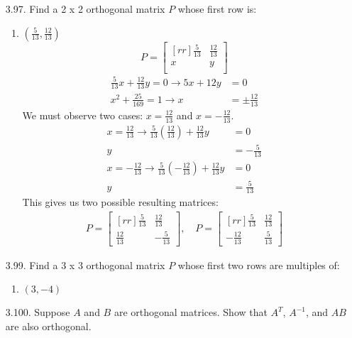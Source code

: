 \documentclass[12pt]{article}
\begin{document}
\begin{enumerate}
\begin{enumerate}
	
	\item $A^2$
	\begin{proof}
	Assume that $A$ is symmetric, then $A=A^T$. We show that $A^2=(A^2)^T$.\\
	Note that $A^2 = A*A$. Since $A$ is symmetric, then $A*A=A^T*A^T$ and by the distributive law,$A^T*A^T=(A*A)^T=(A^2)^T$.
	\end{proof}	
	
	\end{enumerate}


\item [3.97.] Find a 2 x 2 orthogonal matrix $P$ whose first row is:
	\begin{enumerate}
	\item $(\frac{5}{13}, \frac{12}{13})$\\
	\[ P= \begin{bmatrix}[rr] \frac{5}{13} & \frac{12}{13}\\ x & y\\ \end{bmatrix}\]
	\begin{align*}
	\frac{5}{13}x + \frac{12}{13}y = 0 \rightarrow 5x+12y &= 0\\
	x^2 + \frac{25}{169} = 1 \rightarrow x &= \pm \frac{12}{13}
	\end{align*}
	We must observe two cases: $x= \frac{12}{13}$ and $x= -\frac{12}{13}$.
	\begin{align*}
	x=\frac{12}{13} \rightarrow \frac{5}{13}(\frac{12}{13}) + \frac{12}{13}y &= 0\\
	y &= -\frac{5}{13}\\
	x=-\frac{12}{13} \rightarrow \frac{5}{13}(-\frac{12}{13}) + \frac{12}{13}y &= 0\\
	y &= \frac{5}{13}
	\end{align*}
	This gives us two possible resulting matrices:
	\begin{align*}
	P= \begin{bmatrix}[rr] \frac{5}{13} & \frac{12}{13}\\ \frac{12}{13} & -\frac{5}{13} \end{bmatrix}, \quad
	P= \begin{bmatrix}[rr] \frac{5}{13} & \frac{12}{13}\\ -\frac{12}{13} & \frac{5}{13} \end{bmatrix}
	\end{align*}
	\end{enumerate}


\item [3.99.] Find a 3 x 3 orthogonal matrix $P$ whose first two rows are multiples of:
	\begin{enumerate}
	\item $(3, -4)$\\

	\end{enumerate}


\item [3.100.] Suppose $A$ and $B$ are orthogonal matrices. Show that $A^T$, $A^{-1}$, and $AB$ are also orthogonal.\\
\end{enumerate}
\end{document}
